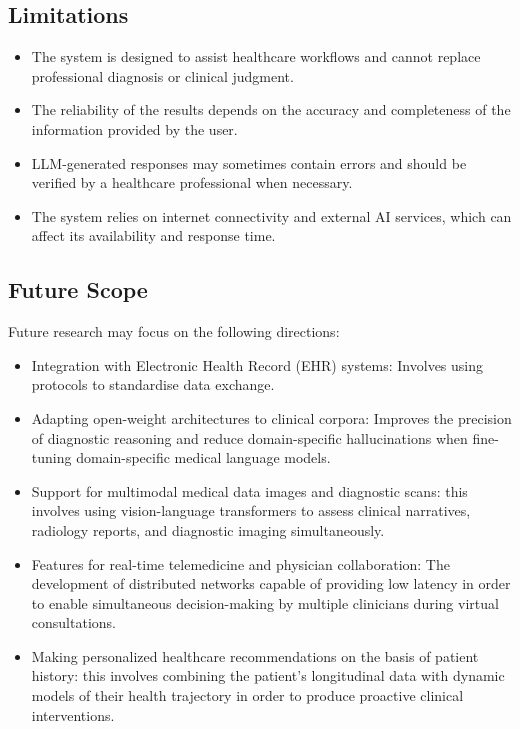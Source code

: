 \documentclass[conference]{IEEEtran}
\begin{document}
\subsection{Limitations}

\begin{itemize}
    \item The system is designed to assist healthcare workflows and cannot replace professional diagnosis or clinical judgment.

    \item The reliability of the results depends on the accuracy and completeness of the information provided by the user.

    \item LLM-generated responses may sometimes contain errors and should be verified by a healthcare professional when necessary.

    \item The system relies on internet connectivity and external AI services, which can affect its availability and response time.
\end{itemize}

\subsection{Future Scope}

Future research may focus on the following directions:

\begin{itemize}
    \item Integration with Electronic Health Record (EHR) systems: Involves using protocols to standardise data exchange.
    
    \item Adapting open-weight architectures to clinical corpora: Improves the precision of diagnostic reasoning and reduce domain-specific hallucinations when fine-tuning domain-specific medical language models.
    
    \item Support for multimodal medical data images and diagnostic scans: this involves using vision-language transformers to assess clinical narratives, radiology reports, and diagnostic imaging simultaneously.
    
    \item Features for real-time telemedicine and physician collaboration: The development of distributed networks capable of providing low latency in order to enable simultaneous decision-making by multiple clinicians during virtual consultations.
    
    \item Making personalized healthcare recommendations on the basis of patient history: this involves combining the patient's longitudinal data with dynamic models of their health trajectory in order to produce proactive clinical interventions.
    
\end{itemize}
\end{document}
